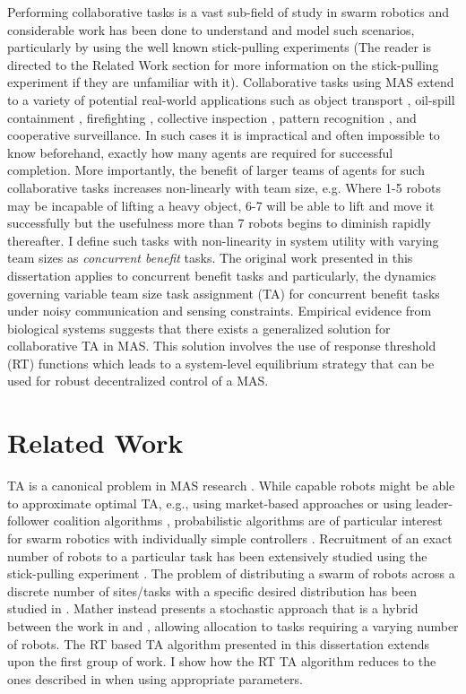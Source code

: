 \documentclass[defaultstyle,12pt]{thesis}
\begin{document}
Performing collaborative tasks is a vast sub-field of study in swarm robotics and considerable work has been done to understand and model such scenarios, particularly by \cite{Martinoli1995, Martinoli1999b, Agassounon2001, Ijspeert2001, Agassounon2002} using the well known stick-pulling experiments (The reader is directed to the Related Work section for more information on the stick-pulling experiment if they are unfamiliar with it). Collaborative tasks using MAS extend to a variety of potential real-world applications such as object transport \cite{Sugawara2012}, oil-spill containment \cite{Beni2005}, firefighting \cite{Kanakia2014}, collective inspection \cite{Correll2007}, pattern recognition \cite{Beni1993}, and cooperative surveillance. In such cases it is impractical and often impossible to know beforehand, exactly how many agents are required for successful completion. More importantly, the benefit of larger teams of agents for such collaborative tasks increases non-linearly with team size, e.g. Where 1-5 robots may be incapable of lifting a heavy object, 6-7 will be able to lift and move it successfully but the usefulness more than 7 robots begins to diminish rapidly thereafter. I define such tasks with non-linearity in system utility with varying team sizes as \emph{concurrent benefit} tasks. The original work presented in this dissertation applies to concurrent benefit tasks and particularly, the dynamics governing variable team size task assignment (TA) for concurrent benefit tasks under noisy communication and sensing constraints. Empirical evidence from biological systems suggests that there exists a generalized solution for collaborative TA in MAS. This solution involves the use of response threshold (RT) functions which leads to a system-level equilibrium strategy that can be used for robust decentralized control of a MAS.

\section{Related Work}\label{sec:relwork}
TA is a canonical problem in MAS research \cite{Gerkey2004}. While capable robots might be able to approximate optimal TA, e.g., using market-based approaches \cite{Amstutz2008,Vig2007} or using  leader-follower coalition algorithms \cite{Chen2011}, probabilistic algorithms are of particular interest for swarm robotics with individually simple controllers \cite{Dantu2012}. Recruitment of an exact number of robots to a particular task has been extensively studied using the stick-pulling experiment \cite{Lerman2001,Martinoli2004}. The problem of distributing a swarm of robots across a discrete number of sites/tasks with a specific desired distribution has been studied in \cite{Berman2009,Correll2008}. Mather \cite{Mather2010} instead presents a stochastic approach that is a hybrid between the work in \cite{Berman2009} and \cite{Martinoli2004}, allowing allocation to tasks requiring a varying number of robots. The RT based TA algorithm presented in this dissertation extends upon the first group of work. I show how the RT TA algorithm reduces to the ones described in \cite{Lerman2001,Martinoli2004} when using appropriate parameters. 
\end{document}
